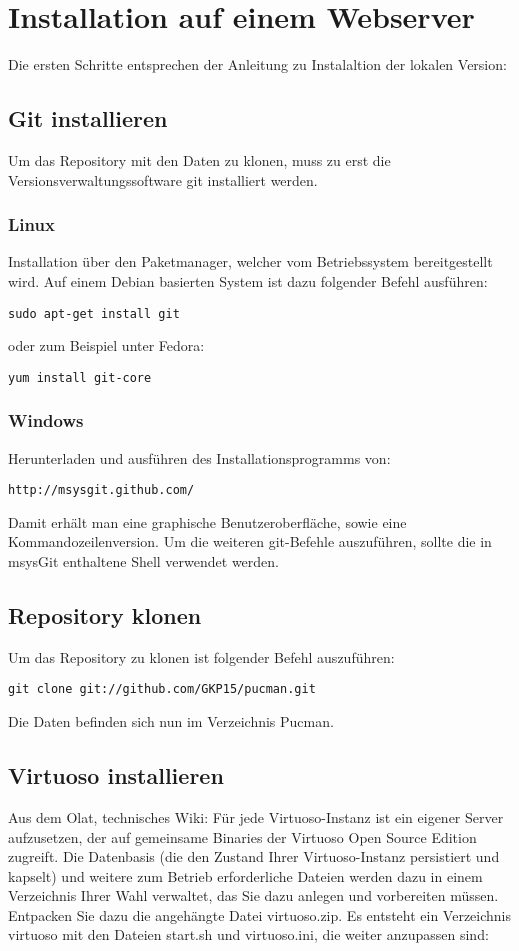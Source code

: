 \documentclass[11pt,a4paper]{article}
\begin{document}
\section{Installation auf einem Webserver}
Die ersten Schritte entsprechen der Anleitung zu Instalaltion der lokalen Version:
\subsection{Git installieren}
Um das Repository mit den Daten zu klonen, muss zu erst die Versionsverwaltungssoftware git installiert werden.
\subsubsection{Linux}
Installation über den Paketmanager, welcher vom Betriebssystem bereitgestellt wird.
Auf einem Debian basierten System ist dazu folgender Befehl ausführen:
\begin{lstlisting}
sudo apt-get install git
\end{lstlisting}
oder zum Beispiel unter Fedora:
\begin{lstlisting}
yum install git-core
\end{lstlisting}
\subsubsection{Windows}
Herunterladen und ausführen des Installationsprogramms von:
\begin{lstlisting}
http://msysgit.github.com/
\end{lstlisting}
Damit erhält man eine graphische Benutzeroberfläche, sowie eine Kommandozeilenversion.
Um die weiteren git-Befehle auszuführen, sollte die in msysGit enthaltene Shell verwendet werden.
\subsection{Repository klonen}
Um das Repository zu klonen ist folgender Befehl auszuführen:
\begin{lstlisting}
git clone git://github.com/GKP15/pucman.git
\end{lstlisting}
Die Daten befinden sich nun im Verzeichnis Pucman.
\subsection{Virtuoso installieren}
Aus dem Olat, technisches Wiki:
Für jede Virtuoso-Instanz ist ein eigener Server aufzusetzen, der auf gemeinsame Binaries der Virtuoso Open Source Edition zugreift. Die Datenbasis (die den Zustand Ihrer Virtuoso-Instanz persistiert und kapselt) und weitere zum Betrieb erforderliche Dateien werden dazu in einem Verzeichnis Ihrer Wahl verwaltet, das Sie dazu anlegen und vorbereiten müssen.
Entpacken Sie dazu die angehängte Datei virtuoso.zip. Es entsteht ein Verzeichnis virtuoso mit den Dateien start.sh und virtuoso.ini, die weiter anzupassen sind:
\end{document}
